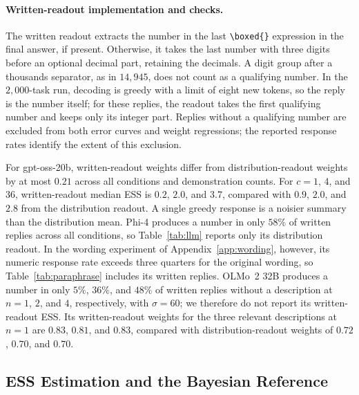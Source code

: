 \documentclass{article}
\theoremstyle{definition}
\begin{document}
\paragraph{Written-readout implementation and checks.}
The written readout extracts the number in the last \verb|\boxed{}| expression in the final answer, if present. Otherwise, it takes the last number with three digits before an optional decimal part, retaining the decimals. A digit group after a thousands separator, as in $14{,}945$, does not count as a qualifying number. In the $2{,}000$-task run, decoding is greedy with a limit of eight new tokens, so the reply is the number itself; for these replies, the readout takes the first qualifying number and keeps only its integer part. Replies without a qualifying number are excluded from both error curves and weight regressions; the reported response rates identify the extent of this exclusion.

For gpt-oss-20b, written-readout weights differ from distribution-readout weights by at most $0.21$ across all conditions and demonstration counts. For $c = 1$, $4$, and $36$, written-readout median ESS is $0.2$, $2.0$, and $3.7$, compared with $0.9$, $2.0$, and $2.8$ from the distribution readout. A single greedy response is a noisier summary than the distribution mean. Phi-4 produces a number in only $58\%$ of written replies across all conditions, so Table~\ref{tab:llm} reports only its distribution readout. In the wording experiment of Appendix~\ref{app:wording}, however, its numeric response rate exceeds three quarters for the original wording, so Table~\ref{tab:paraphrase} includes its written replies. OLMo~2 32B produces a number in only $5\%$, $36\%$, and $48\%$ of written replies without a description at $n = 1$, $2$, and $4$, respectively, with $\sigma = 60$; we therefore do not report its written-readout ESS. Its written-readout weights for the three relevant descriptions at $n = 1$ are $0.83$, $0.81$, and $0.83$, compared with distribution-readout weights of $0.72$, $0.70$, and $0.70$.

\subsection{ESS Estimation and the Bayesian Reference}\label{app:ess-est}
\end{document}
